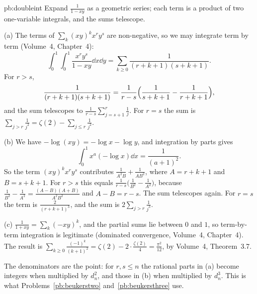 \begin{solution}{pb:doubleint}
\idea Expand $\frac1{1-xy}$ as a geometric series; each term is a product of two one-variable integrals, and the sums telescope.

\writeup (a) The terms of $\sum_k(xy)^kx^ry^s$ are non-negative, so we may integrate term by term (Volume~4, Chapter~4):
\[
\int_0^1\!\!\int_0^1\frac{x^ry^s}{1-xy}\dd x\dd y=\sum_{k\ge0}\frac1{(r+k+1)(s+k+1)}.
\]
For $r>s$,
\[
\frac1{(r+k+1)(s+k+1)}=\frac1{r-s}\Bigl(\frac1{s+k+1}-\frac1{r+k+1}\Bigr),
\]
and the sum telescopes to $\frac1{r-s}\sum_{j=s+1}^r\frac1j$. For
$r=s$ the sum is $\sum_{j>r}\frac1{j^2}=\zeta(2)-\sum_{j\le r}\frac1{j^2}$.

(b) We have $-\log(xy)=-\log x-\log y$, and integration by parts gives
\[
\int_0^1x^a(-\log x)\dd x=\frac1{(a+1)^2}.
\]
So the term $(xy)^kx^ry^s$ contributes $\frac1{A^2B}+\frac1{AB^2}$, where $A=r+k+1$ and $B=s+k+1$. For $r>s$ this equals
$\frac1{r-s}\bigl(\frac1{B^2}-\frac1{A^2}\bigr)$, because $\frac1{B^2}-\frac1{A^2}=\frac{(A-B)(A+B)}{A^2B^2}$ and $A-B=r-s$. The sum telescopes again. For $r=s$ the term is
$\frac2{(r+k+1)^3}$, and the sum is $2\sum_{j>r}\frac1{j^3}$.

(c) $\frac1{1+xy}=\sum_k(-xy)^k$, and the partial sums lie between $0$ and $1$, so term-by-term integration is legitimate (dominated
convergence, Volume~4, Chapter~4). The result is $\sum_{k\ge0}\frac{(-1)^k}{(k+1)^2}=\zeta(2)-2\cdot\frac{\zeta(2)}4=\frac{\pi^2}{12}$, by Volume~4, Theorem~3.7.

\leads The denominators are the point: for $r,s\le n$ the rational parts in (a) become integers when multiplied by $d_n^2$, and those
in (b) when multiplied by $d_n^3$. This is what Problems~\ref{pb:beukerstwo} and~\ref{pb:beukersthree} use.
\end{solution}

